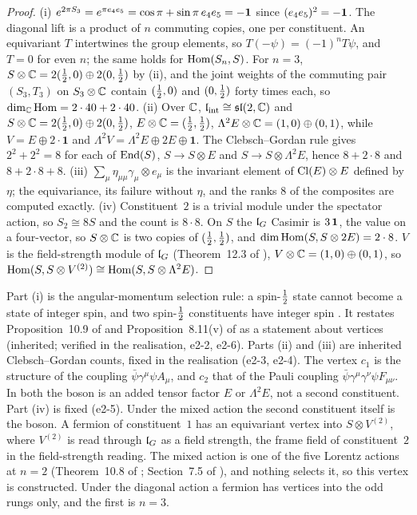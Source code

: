 \begin{proof}
(i) $e^{2\pi S_3}=e^{\pi e_4e_5}=\cos\pi+\sin\pi\,e_4e_5=-\mathbf 1$ since $(e_4e_5)^2=-\mathbf 1$. The diagonal lift is a product of $n$ commuting copies,
one per constituent. An equivariant $T$ intertwines the group elements, so $T(-\psi)=(-1)^nT\psi$, and $T=0$ for even $n$; the same holds for
$\operatorname{Hom}(S_n,S)$. For $n=3$, $S\otimes\mathbb{C}=2(\tfrac12,0)\oplus2(0,\tfrac12)$ by (ii), and the joint weights of the commuting pair $(S_3,T_3)$ on $S_3\otimes\mathbb{C}$
contain $(\tfrac12,0)$ and $(0,\tfrac12)$ forty times each, so $\dim_{\mathbb{C}}\operatorname{Hom}=2\cdot40+2\cdot40$. (ii) Over $\mathbb{C}$, $\mathfrak l_{\rm int}\cong\mathfrak{sl}(2,\mathbb{C})$ and
$S\otimes\mathbb{C}=2(\tfrac12,0)\oplus2(0,\tfrac12)$, $E\otimes\mathbb{C}=(\tfrac12,\tfrac12)$, $\Lambda^2E\otimes\mathbb{C}=(1,0)\oplus(0,1)$, while $V=E\oplus2\cdot\mathbf1$ and
$\Lambda^2V=\Lambda^2E\oplus2E\oplus\mathbf1$. The Clebsch--Gordan rule gives $2^2+2^2=8$ for each of $\operatorname{End}(S)$, $S\to S\otimes E$ and $S\to S\otimes\Lambda^2E$,
hence $8+2\cdot8$ and $8+2\cdot8+8$. (iii) $\sum_\mu\eta_{\mu\mu}\gamma_\mu\otimes e_\mu$ is the invariant element of $\mathrm{Cl}(E)\otimes E$ defined by $\eta$; the
equivariance, its failure without $\eta$, and the ranks $8$ of the composites are computed exactly. (iv) Constituent~$2$ is a trivial
module under the spectator action, so $S_2\cong8S$ and the count is $8\cdot8$. On $S$ the $\mathfrak l_G$ Casimir is $3\,\mathbf 1$, the value on a
four-vector, so $S\otimes\mathbb{C}$ is two copies of $(\tfrac12,\tfrac12)$, and $\dim\operatorname{Hom}(S,S\otimes2E)=2\cdot8$. $V$ is the field-strength module of $\mathfrak l_G$
(Theorem~12.3 of \cite{ES17}), $V\otimes\mathbb{C}=(1,0)\oplus(0,1)$, so $\operatorname{Hom}(S,S\otimes V^{(2)})\cong\operatorname{Hom}(S,S\otimes\Lambda^2E)$.
\end{proof}

Part (i) is the angular-momentum selection rule: a spin-$\tfrac12$ state cannot become a state of integer spin, and two spin-$\tfrac12$
constituents have integer spin \cite{EhrenfestOppenheimer31,WeinbergQFT}. It restates Proposition~10.9 of \cite{ES17} and
Proposition~8.11(v) of \cite{RE} as a statement about vertices (inherited; verified in the realisation, e2-2, e2-6). Parts (ii) and (iii) are
inherited Clebsch--Gordan counts, fixed in the realisation (e2-3, e2-4). The vertex $c_1$ is the structure of the coupling
$\bar\psi\gamma^\mu\psi A_\mu$, and $c_2$ that of the Pauli coupling $\bar\psi\gamma^\mu\gamma^\nu\psi F_{\mu\nu}$. In both the boson is an
added tensor factor $E$ or $\Lambda^2E$, not a second constituent. Part (iv) is fixed (e2-5). Under the mixed action the second constituent
itself is the boson. A fermion of constituent~$1$ has an equivariant vertex into $S\otimes V^{(2)}$, where $V^{(2)}$ is read through $\mathfrak l_G$ as a
field strength, the frame field of constituent~$2$ in the field-strength reading. The mixed action is one of the five Lorentz actions at
$n=2$ (Theorem~10.8 of \cite{ES17}; Section~7.5 of \cite{RE}), and nothing selects it, so this vertex is constructed. Under the diagonal action a
fermion has vertices into the odd rungs only, and the first is $n=3$.

